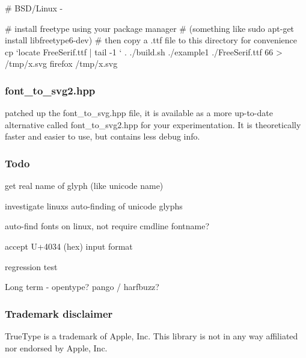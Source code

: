 \begin{DoxyVerb}# BSD/Linux - 

# install freetype using your package manager
# (something like sudo apt-get install libfreetype6-dev)
# then copy a .ttf file to this directory for convenience
cp `locate FreeSerif.ttf | tail -1 ` .
./build.sh
./example1 ./FreeSerif.ttf 66 > /tmp/x.svg 
firefox /tmp/x.svg
\end{DoxyVerb}


\subsubsection*{font\+\_\+to\+\_\+svg2.\+hpp}

patched up the font\+\_\+to\+\_\+svg.\+hpp file, it is available as a more up-\/to-\/date alternative called font\+\_\+to\+\_\+svg2.\+hpp for your experimentation. It is theoretically faster and easier to use, but contains less debug info.

\subsubsection*{Todo}

get real name of glyph (like unicode name)

investigate linux\textquotesingle{}s auto-\/finding of unicode glyphs

auto-\/find fonts on linux, not require cmdline fontname?

accept U+4034 (hex) input format

regression test

Long term -\/ opentype? pango / harfbuzz?

\subsubsection*{Trademark disclaimer}

True\+Type is a trademark of Apple, Inc. This library is not in any way affiliated nor endorsed by Apple, Inc. 